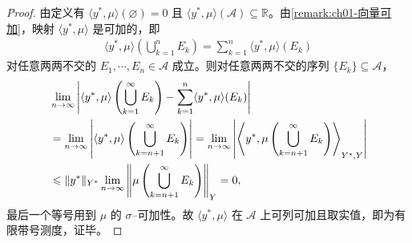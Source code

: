 \documentclass[../../main.tex]{subfiles}%
\begin{document}
\begin{proof}
由定义有 $\langle y^*,\mu\rangle(\varnothing)=0$ 且 $\langle y^*,\mu\rangle(\mathcal{A})\subseteq\mathbb{R}$。由\cref{remark:ch01-向量可加}，映射 $\langle y^*,\mu\rangle$ 是可加的，即
\begin{align*}
\langle y^*,\mu\rangle\left(\bigcup_{k=1}^n E_k\right)=\sum_{k=1}^n\langle y^*,\mu\rangle(E_k)
\end{align*}
对任意两两不交的 $E_1,\cdots ,E_n\in\mathcal{A}$ 成立。则对任意两两不交的序列 $\{E_k\}\subseteq\mathcal{A}$，
\begin{align}
&\lim_{n\to\infty}\left|\langle y^*,\mu\rangle\left(\bigcup_{k=1}^\infty E_k\right)-\sum_{k=1}^n\langle y^*,\mu\rangle(E_k)\right|\notag\\
&=\lim_{n\to\infty}\left|\langle y^*,\mu\rangle\left(\bigcup_{k=n+1}^\infty E_k\right)\right|
=\lim_{n\to\infty}\left|\left\langle y^*,\mu\left(\bigcup_{k=n+1}^\infty E_k\right)\right\rangle_{Y^*,Y}\right|\notag\\
&\leqslant\|y^*\|_{Y^*}\lim_{n\to\infty}\left\|\mu\left(\bigcup_{k=n+1}^\infty E_k\right)\right\|_Y=0, \label{align:ch01-标量化证明}
\end{align}
最后一个等号用到 $\mu$ 的 $\sigma$--可加性。故 $\langle y^*,\mu\rangle$ 在 $\mathcal{A}$ 上可列可加且取实值，即为有限带号测度，证毕。
\end{proof}
\end{document}
